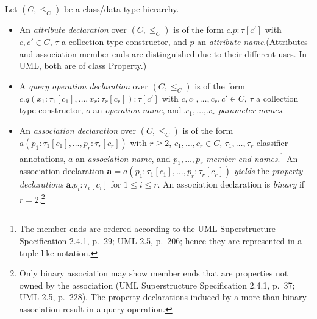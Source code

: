 \documentclass[10pt,fleqn,final]{scrreprt}
\newcommand{\cbs}[0]{\color{red}\xspace} %
\newcommand{\cbe}[0]{\color{black}\xspace} %
\newenvironment{definitions}[0]{\medskip }{}
\newcommand{\uml}[1]{\textsf{#1}}
\begin{document}
\begin{definitions}
\medskip
Let $(C, {\leq_C})$ be a class/data type hierarchy.
%
\begin{itemize}[label={--}, leftmargin=*]
  \item An \emph{attribute declaration} over $(C, {\leq_C})$ is of the form
$c.p : \tau[c']$ with $c, c' \in C$, $\tau$ a collection type
constructor, and $p$ an \emph{attribute name}.\cbs ({Attributes
  and association member ends are distinguished due to their different uses.  In UML,
  both are of class \uml{Property}.})\cbe 

  \item A \emph{query operation declaration} over $(C, {\leq_C})$ is of
the form $c.q(x_1 : \tau_1[c_1], \dots, x_r : \tau_r[c_r]) : \tau[c']$
with $c, c_1,\ldots, c_r, c' \in C$, $\tau$ a collection type
constructor, $o$ an \emph{operation name}, and $x_1, \ldots, x_r$
\emph{parameter names}.

\item An \emph{association declaration} over $(C, {\leq_C})$ is of the
form $a(p_1 : \tau_1[c_1], \dots, p_r : \tau_r[c_r])$ with $r \geq 2$,
$c_1, \dots, c_r \in C$, $\tau_1, \ldots, \tau_r$ classifier
annotations, $a$ an \emph{association name}, and $p_1, \dots, p_r$
\emph{member end names}.\footnote{The member ends are ordered according
  to the UML Superstructure Specification 2.4.1, p.~29; UML 2.5, p.~206;
  hence\cbs they are represented in a\cbe tuple-like notation.}  An association declaration
$\mathbf{a} = a(p_1 : \tau_1[c_1], \ldots, p_r : \tau_r[c_r])$
\emph{yields} the \emph{property declarations}
$\mathbf{a}.p_i : \tau_i[c_i]$ for $1 \leq i \leq r$.  An association
declaration is \emph{binary} if $r = 2$.\footnote{Only binary
  association may show member ends that are properties not owned by the
  association (UML Superstructure Specification 2.4.1, p.~37; UML 2.5,
  p.~228).  The property declarations induced by a more than binary
  association result in a query operation.}


\end{itemize}
\end{definitions}
\end{document}
